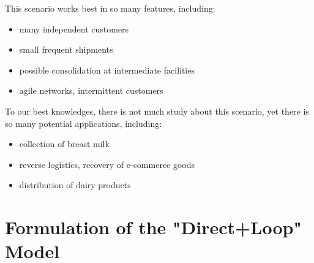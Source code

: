 \documentclass[12pt, a4paper]{article}
\begin{document}
This scenario works best in so many features, including:
	\begin{itemize}
		\item many independent customers 
		\item small frequent shipments
		\item possible consolidation at intermediate facilities
		\item agile networks, intermittent customers
	\end{itemize}	
To our best knowledges, there is not much study about this scenario, yet there is so many potential applications, including:
\begin{itemize}
	\item collection of breast milk
	\item reverse logistics, recovery of e-commerce goods
	\item distribution of dairy products
\end{itemize}

\section{Formulation of the "Direct+Loop" Model}
\end{document}

